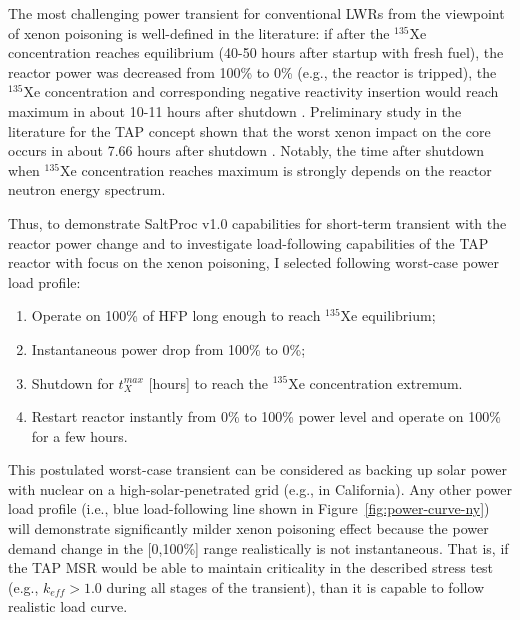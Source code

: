 The most challenging power transient for conventional \glspl{LWR} from the 
viewpoint of xenon poisoning is well-defined in the literature: if after the 
$^{135}$Xe concentration reaches equilibrium (40-50 hours after startup with 
fresh fuel), the reactor power was decreased from 100\% to 0\% (e.g., the 
reactor is tripped), the $^{135}$Xe concentration and corresponding negative 
reactivity insertion would reach maximum in about 10-11 hours after shutdown 
\cite{lamarsh_introduction_1975, 
bell_nuclear_1970}. Preliminary study in the literature for the \gls{TAP} 
concept shown that the worst xenon impact on the core occurs in about 7.66 
hours after shutdown \cite{rykhlevskii_impact_2019}. Notably, the time after 
shutdown when $^{135}$Xe concentration reaches maximum is strongly depends on 
the reactor neutron energy spectrum.

Thus, to demonstrate SaltProc v1.0 capabilities for short-term transient with 
the reactor power change and to
investigate load-following capabilities of the \gls{TAP} reactor with focus on 
the xenon poisoning, I selected following worst-case power load profile:
\begin{enumerate}[label=(\alph*), noitemsep, topsep=0pt]
	\item Operate on 100\% of \gls{HFP} long enough to reach $^{135}$Xe 
	equilibrium;
	\item Instantaneous power drop from 100\% to 0\%;
	\item Shutdown for $t^{max}_X$ [hours] to reach the $^{135}$Xe 
	concentration extremum.
	\item Restart reactor instantly from 0\% to 100\% power level and operate 
	on 100\% for a few hours.
\end{enumerate}
This postulated worst-case transient can be considered as backing up solar 
power with 
nuclear on a high-solar-penetrated grid (e.g., in California).
Any other power load profile (i.e., blue load-following line shown in  
Figure~\ref{fig:power-curve-ny}) will demonstrate significantly milder xenon 
poisoning effect because the power demand change in the [0,100\%] range 
realistically is not instantaneous. That is, if the \gls{TAP} \gls{MSR} would 
be able to maintain criticality in the described stress test (e.g., 
$k_{eff}>1.0$ during all stages of the transient), than it is capable to 
follow realistic load curve.

